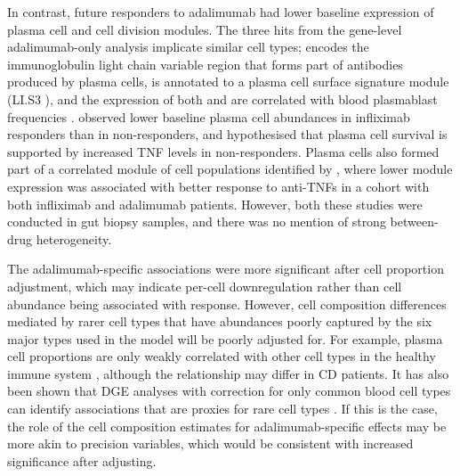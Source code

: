 In contrast, future responders to adalimumab had lower baseline expression of plasma cell and cell division modules.
The three hits from the gene-level adalimumab-only analysis implicate similar cell types;
 encodes the immunoglobulin light chain variable region that forms part of antibodies produced by plasma cells,
 is annotated to a plasma cell surface signature module (LI.S3 \autocite{li2013MolecularSignaturesAntibody}), 
and the expression of both  and  are correlated with blood plasmablast frequencies \autocite{tsang2014GlobalAnalysesHuman}.
\textcite{gaujoux2019CellcentredMetaanalysisReveals} observed lower baseline plasma cell abundances in infliximab responders than in non-responders,
and hypothesised that plasma cell survival is supported by increased \gls{TNF} levels in non-responders.
Plasma cells also formed part of a correlated module of cell populations identified by \textcite{martin2019SingleCellAnalysisCrohn},
where lower module expression was associated with better response to anti-\glspl{TNF} in a cohort with both infliximab and adalimumab patients.
However, both these studies were conducted in gut biopsy samples, and there was no mention of strong between-drug heterogeneity.

The adalimumab-specific associations were more significant after cell proportion adjustment, 
which may indicate per-cell downregulation rather than cell abundance being associated with response.
However, cell composition differences mediated by rarer cell types that have abundances poorly captured by the six major types used in the model will be poorly adjusted for.
For example, plasma cell proportions are only weakly correlated with other cell types in the healthy immune system \autocite{zalocusky201810000Immunomes}, 
although the relationship may differ in \gls{CD} patients.
It has also been shown that \gls{DGE} analyses with correction for only common blood cell types can identify associations that are proxies for rare cell types \autocite{pellegrinocoppola2020CorrectionBothCommon}.
If this is the case, the role of the cell composition estimates for adalimumab-specific effects may be more akin to precision variables, 
which would be consistent with increased significance after adjusting.


